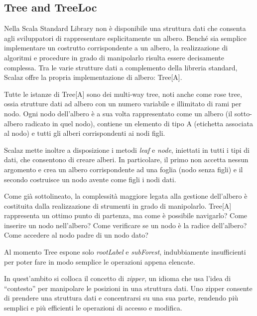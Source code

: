\subsection{Tree and TreeLoc}

Nella Scala Standard Library non è disponibile una struttura dati che consenta agli sviluppatori di rappresentare esplicitamente un albero. Benché sia semplice implementare un costrutto corrispondente a un albero, la realizzazione di algoritmi e procedure in grado di manipolarlo risulta essere decisamente complessa. Tra le varie strutture dati a complemento della libreria standard, Scalaz offre la propria implementazione di albero: Tree[A].

Tutte le istanze di Tree[A] sono dei multi-way tree, noti anche come rose tree, ossia strutture dati ad albero con un numero variabile e illimitato di rami per nodo. Ogni nodo dell'albero è a sua volta rappresentato come un albero (il sotto-albero radicato in quel nodo), contiene un elemento di tipo A (etichetta associata al nodo) e tutti gli alberi corrispondenti ai nodi figli.

Scalaz mette inoltre a disposizione i metodi \textit{leaf} e \textit{node}, iniettati in tutti i tipi di dati, che consentono di creare alberi. In particolare, il primo non accetta nessun argomento e crea un albero corrispondente ad una foglia (nodo senza figli) e il secondo costruisce un nodo avente come figli i nodi dati.



Come già sottolineato, la complessità maggiore legata alla gestione dell'albero è costituita dalla realizzazione di strumenti in grado di manipolarlo. Tree[A] rappresenta un ottimo punto di partenza, ma come è possibile navigarlo? Come inserire un nodo nell'albero? Come verificare se un nodo è la radice dell'albero? Come accedere al nodo padre di un nodo dato?

Al momento Tree espone solo \textit{rootLabel} e \textit{subForest}, indubbiamente insufficienti per poter fare in modo semplice le operazioni appena elencate.

In quest'ambito si colloca il concetto di \textit{zipper}, un idioma che usa l'idea di ``contesto'' per manipolare le posizioni in una struttura dati. Uno zipper consente di prendere una struttura dati e concentrarsi su una sua parte, rendendo più semplici e più efficienti le operazioni di accesso e modifica.

